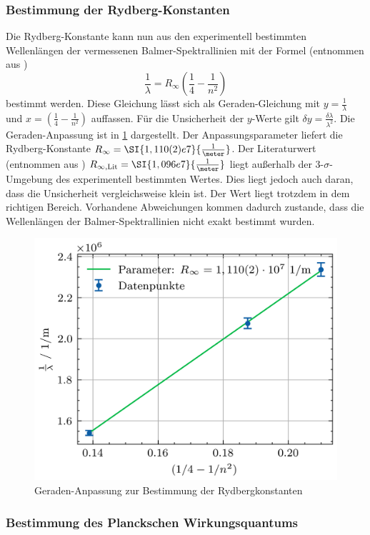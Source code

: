 \subsubsection{Bestimmung der Rydberg-Konstanten}\label{subsubsec:rydberg}
Die Rydberg-Konstante kann nun aus den experimentell bestimmten Wellenlängen der vermessenen Balmer-Spektrallinien mit der Formel (entnommen aus \cite{balmer_handblatt})
\begin{equation*}
    \frac{1}{\lambda} = R_{\infty} \left(\frac{1}{4} - \frac{1}{n^2}\right)
\end{equation*} bestimmt werden. Diese Gleichung lässt sich als Geraden-Gleichung mit $y = \frac{1}{\lambda}$ und $x = \left(\frac{1}{4} - \frac{1}{n^2}\right)$
auffassen. Für die Unsicherheit der $y$-Werte gilt $\delta y = \frac{\delta \lambda}{\lambda^2}$. Die Geraden-Anpassung ist in \cref{fig:geraden_fit_rydbergkonstante}
dargestellt. Der Anpassungsparameter liefert die Rydberg-Konstante $R_{\infty} = \SI{1,110(2)e7}{\frac{1}{\meter}}$.
Der Literaturwert (entnommen aus \cite{demtröder}) $R_{\infty,\mathrm{Lit}} = \SI{1,096e7}{\frac{1}{\meter}}$ liegt außerhalb der 3-$\sigma$-Umgebung des experimentell bestimmten Wertes.
Dies liegt jedoch auch daran, dass die Unsicherheit vergleichsweise klein ist. Der Wert liegt trotzdem in dem richtigen Bereich. Vorhandene Abweichungen kommen dadurch zustande,
dass die Wellenlängen der Balmer-Spektrallinien nicht exakt bestimmt wurden.
\begin{figure}[H]
	\centering
	\includegraphics[width=0.8\linewidth]{../figs/rydbergkonstante_fit.png}
	\caption{Geraden-Anpassung zur Bestimmung der Rydbergkonstanten}
	\label{fig:geraden_fit_rydbergkonstante}
\end{figure}
\subsubsection{Bestimmung des Planckschen Wirkungsquantums}